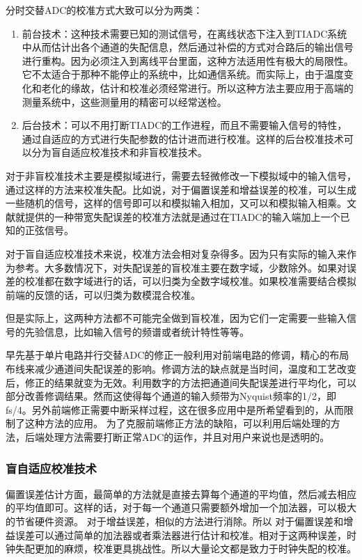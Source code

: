		
	分时交替ADC的校准方式大致可以分为两类：
	\begin {enumerate}
		\item 前台技术：这种技术需要已知的测试信号，在离线状态下注入到TIADC系统中从而估计出各个通道的失配信息，然后通过补偿的方式对合路后的输出信号进行重构。因为必须注入到离线平台里面，这种方法适用性有极大的局限性。它不太适合于那种不能停止的系统中，比如通信系统。而实际上，由于温度变化和老化的缘故，估计和校准必须经常进行。所以这种方法主要应用于高端的测量系统中，这些测量用的精密可以经常送检。		\item 后台技术：可以不用打断TIADC的工作进程，而且不需要输入信号的特性，通过自适应的方式进行失配参数的估计进而进行校准。这样的后台校准技术可以分为盲自适应校准技术和非盲校准技术。
	\end {enumerate}
		对于非盲校准技术主要是模拟域进行，需要去轻微修改一下模拟域中的输入信号，通过这样的方法来校准失配。比如说，对于偏置误差和增益误差的校准，可以生成一些随机的信号，这样的信号即可以和模拟输入相加，又可以和模拟输入相乘。文献就提供的一种带宽失配误差的校准方法就是通过在TIADC的输入端加上一个已知的正弦信号。\par


		对于盲自适应校准技术来说，校准方法会相对复杂得多。因为只有实际的输入来作为参考。大多数情况下，对失配误差的盲校准主要在数字域，少数除外。如果对误差的校准都在数字域进行的话，可以归类为全数字域校准。如果校准需要结合模拟前端的反馈的话，可以归类为数模混合校准。\par
		但是实际上，这两种方法都不可能完全做到盲校准，因为它们一定需要一些输入信号的先验信息，比如输入信号的频谱或者统计特性等等。\par
	
		早先基于单片电路并行交替ADC的修正一般利用对前端电路的修调，精心的布局布线来减少通道间失配误差的影响。修调方法的缺点就是当时间，温度和工艺改变后，修正的结果就变为无效。利用数字的方法把通道间失配误差进行平均化，可以部分改善修调结果。然而这使得每个通道的输入频带为Nyquist频率的1/2，即fs/4。另外前端修正需要中断采样过程，这在很多应用中是所希望看到的，从而限制了这种方法的应用。
		为了克服前端修正方法的缺陷，可以利用后端处理的方法，后端处理方法需要打断正常ADC的运作，并且对用户来说也是透明的。
		
		
			\subsubsection {盲自适应校准技术}
			
				偏置误差估计方面，最简单的方法就是直接去算每个通道的平均值，然后减去相应的平均值即可。这样的话，对于每一个通道只需要额外增加一个加法器，可以极大的节省硬件资源。
				对于增益误差，相似的方法进行消除。所以				
				对于偏置误差和增益误差可以通过简单的加法器或者乘法器进行估计和校准。相对于这两种误差，时钟失配更加的麻烦，校准更具挑战性。所以大量论文都是致力于时钟失配的校准。\par
				
